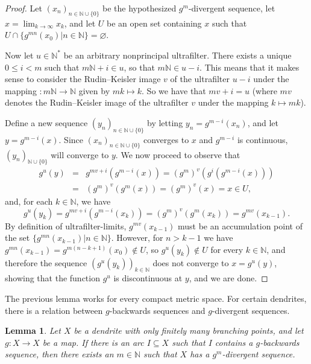\documentclass[12pt]{amsart}
\newtheorem{lemma}[theorem]{Lemma}
\theoremstyle{definition}
\numberwithin{equation}{section}
\begin{document}
\begin{proof}
Let $(x_n)_{n\in\mathbb N\cup\{0\}}$ be the hypothesized $g^m$-divergent sequence, let $x=\lim_{k\to\infty}x_k$, and let $U$ be an open set containing $x$ such that $U\cap\{g^{mn}(x_0)\big|n\in\mathbb N\}=\varnothing$.

Now let $u\in\mathbb N^*$ be an arbitrary nonprincipal ultrafilter. There exists a unique $0 \leq i<m$ such that 
$m\mathbb N+i\in u$, so that $m\mathbb N\in u-i$. This means that it makes sense to consider the Rudin--Keisler image $v$ of the ultrafilter $u-i$ under the mapping $\colon m\mathbb N\longrightarrow\mathbb N$ given by $mk\longmapsto k$. So we have that $mv+i=u$ (where $mv$ denotes the Rudin--Keisler image of the ultrafilter 
$v$ under the mapping $k\longmapsto mk$).

Define a new sequence $(y_n)_{n\in\mathbb N\cup\{0\}}$ by letting $y_n=g^{m-i}(x_n)$, and let $y=g^{m-i}(x)$. 
Since $(x_n)_{n\in\mathbb N\cup\{0\}}$ converges to $x$ and $g^{m-i}$ is continuous, $(y_n)_{\mathbb N\cup\{0\}}$ will converge to $y$. We now proceed to observe that 
\begin{eqnarray*}
g^u(y) & = & g^{mv+i}(g^{m-i}(x))=(g^m)^v(g^i(g^{m-i}(x))) \\
 & = & (g^m)^v(g^m(x))=(g^m)^v(x)=x\in U,
\end{eqnarray*}
and, for each $k\in\mathbb N$, we have
\begin{equation*}
g^u(y_k)=g^{mv+i}(g^{m-i}(x_k))=(g^m)^v(g^m(x_k))=g^{mv}(x_{k-1}).
\end{equation*}
By definition of ultrafilter-limits, $g^{mv}(x_{k-1})$ must be an accumulation point of the set 
$\{g^{mn}(x_{k-1})\big|n\in\mathbb N\}$. However, for $n>k-1$ we have 
$g^{mn}(x_{k-1})=g^{m(n-k+1)}(x_0)\notin U$, so $g^u(y_k)\notin U$ for every $k\in\mathbb N$, and therefore the sequence $(g^u(y_k))_{k\in\mathbb N}$ does not converge to $x=g^u(y)$, showing that the function $g^u$ is discontinuous at $y$, and we are done.
\end{proof}

The previous lemma works for every compact metric space. For certain dendrites, there is a relation between $g$-backwards sequences and $g$-divergent sequences.

\begin{lemma}\label{adequatetoveryadequate}
Let $X$ be a dendrite with only finitely many branching points, and let $g \colon X\longrightarrow X$ be a map. If there is an arc $I\subseteq X$ such that $I$ contains a $g$-backwards sequence, then there exists an $m\in\mathbb N$ such that $X$ has a $g^m$-divergent sequence.
\end{lemma}
\end{document}
